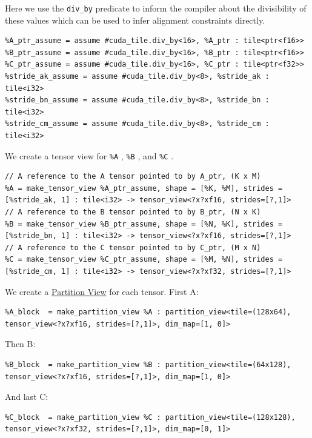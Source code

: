 \documentclass{article}
\begin{document}
Here we use the \texttt{div\_by} predicate to inform the compiler about the divisibility of these values which can be used to infer alignment constraints directly.


\begin{lstlisting}
%A_ptr_assume = assume #cuda_tile.div_by<16>, %A_ptr : tile<ptr<f16>>
%B_ptr_assume = assume #cuda_tile.div_by<16>, %B_ptr : tile<ptr<f16>>
%C_ptr_assume = assume #cuda_tile.div_by<16>, %C_ptr : tile<ptr<f32>>
%stride_ak_assume = assume #cuda_tile.div_by<8>, %stride_ak : tile<i32>
%stride_bn_assume = assume #cuda_tile.div_by<8>, %stride_bn : tile<i32>
%stride_cm_assume = assume #cuda_tile.div_by<8>, %stride_cm : tile<i32>
\end{lstlisting}

We create a tensor view for \texttt{\%A} , \texttt{\%B} , and \texttt{\%C} .


\begin{lstlisting}
// A reference to the A tensor pointed to by A_ptr, (K x M)
%A = make_tensor_view %A_ptr_assume, shape = [%K, %M], strides = [%stride_ak, 1] : tile<i32> -> tensor_view<?x?xf16, strides=[?,1]>
// A reference to the B tensor pointed to by B_ptr, (N x K)
%B = make_tensor_view %B_ptr_assume, shape = [%N, %K], strides = [%stride_bn, 1] : tile<i32> -> tensor_view<?x?xf16, strides=[?,1]>
// A reference to the C tensor pointed to by C_ptr, (M x N)
%C = make_tensor_view %C_ptr_assume, shape = [%M, %N], strides = [%stride_cm, 1] : tile<i32> -> tensor_view<?x?xf32, strides=[?,1]>
\end{lstlisting}

We create a \href{https://docs.nvidia.com/cuda/tile-ir/latest/sections/types.html#type-partition-view}{Partition View} for each tensor. First A:


\begin{lstlisting}
%A_block  = make_partition_view %A : partition_view<tile=(128x64), tensor_view<?x?xf16, strides=[?,1]>, dim_map=[1, 0]>
\end{lstlisting}

Then B:


\begin{lstlisting}
%B_block  = make_partition_view %B : partition_view<tile=(64x128), tensor_view<?x?xf16, strides=[?,1]>, dim_map=[1, 0]>
\end{lstlisting}

And last C:


\begin{lstlisting}
%C_block  = make_partition_view %C : partition_view<tile=(128x128), tensor_view<?x?xf32, strides=[?,1]>, dim_map=[0, 1]>
\end{lstlisting}
\end{document}
